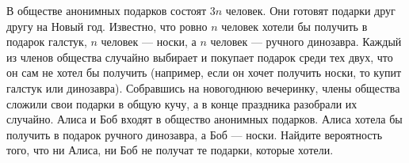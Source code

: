 \documentclass{article}
\begin{document}
В обществе анонимных подарков состоят $3n$ человек. Они готовят подарки друг другу на Новый год. Известно, что ровно $n$ человек хотели бы получить в подарок 
галстук, $n$ человек --- носки, а $n$ человек --- ручного динозавра. Каждый из членов общества случайно выбирает и покупает подарок среди тех двух, 
что он сам не хотел бы получить (например, если он хочет получить носки, то купит галстук или динозавра). Собравшись на новогоднюю вечеринку, 
члены общества сложили свои подарки в общую кучу, а в конце праздника разобрали их случайно. Алиса и Боб входят в общество анонимных подарков. 
Алиса хотела бы получить в подарок ручного динозавра, а Боб --- носки. Найдите вероятность того, что ни Алиса, ни Боб не получат те подарки, 
которые хотели.
\end{document}
